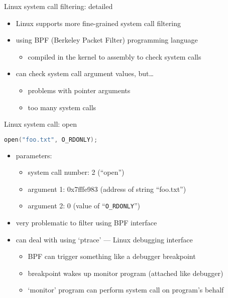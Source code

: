 \begin{frame}{Linux system call filtering: detailed}
    \begin{itemize}
    \item Linux supports more fine-grained system call filtering
    \item using BPF (Berkeley Packet Filter) programming language
        \begin{itemize}
        \item compiled in the kernel to assembly to check system calls
        \end{itemize}
    \vspace{.5cm}
    \item can check system call argument values, but\ldots
        \begin{itemize}
        \item problems with pointer arguments
        \item too many system calls
        \end{itemize}
    \end{itemize}
\end{frame}

\begin{frame}[fragile,label=open]{Linux system call: open}
\begin{lstlisting}[language=C,style=small]
open("foo.txt", O_RDONLY);
\end{lstlisting}
\begin{itemize}
\item parameters:
    \begin{itemize}
    \item system call number: 2 (``open'')
    \item argument 1: 0x7fffe983 (address of string ``foo.txt'')
    \item argument 2: 0 (value of ``\texttt{O\_RDONLY}'')
    \end{itemize}
\item very problematic to filter using BPF interface
\vspace{.5cm}
\item can deal with using `ptrace' --- Linux debugging interface
    \begin{itemize}
    \item BPF can trigger something like a debugger breakpoint
    \item breakpoint wakes up monitor program (attached like debugger)
    \item `monitor' program can perform system call on program's behalf
    \end{itemize}
\end{itemize}
\end{frame}
